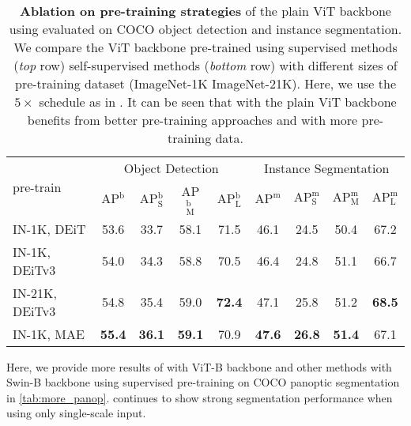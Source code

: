 \begin{table*}[t!]
    \centering
    \footnotesize
    {
    \begin{tabular}{l|cccc|cccc}
    \multirow{2}{*}{pre-train} & \multicolumn{4}{c|}{Object Detection} & \multicolumn{4}{c}{Instance Segmentation} \\
    & AP$^\text{b}$ & AP$^\text{b}_\text{S}$ & AP$^\text{b}_\text{M}$ & AP$^\text{b}_\text{L}$ & $\text{AP}^\text{m}$ & $\text{AP}^\text{m}_\text{S}$ & $\text{AP}^\text{m}_\text{M}$ & $\text{AP}^\text{m}_\text{L}$ \\
    \shline
    IN-1K, DEiT & 53.6 & 33.7 & 58.1 & 71.5 & 46.1 & 24.5 & 50.4 & 67.2 \\
    IN-1K, DEiTv3 & 54.0 & 34.3 & 58.8 & 70.5 & 46.4 & 24.8 & 51.1 & 66.7 \\
    IN-21K, DEiTv3 & 54.8 & 35.4 & 59.0 & {\bf 72.4} & 47.1 & 25.8 & 51.2 & {\bf 68.5} \\
    \hline
    IN-1K, MAE & {\bf 55.4} & {\bf 36.1} & {\bf 59.1} & 70.9 & {\bf 47.6} & {\bf 26.8} & {\bf 51.4} & 67.1 \\
    \end{tabular}
    }
    \caption{
        \textbf{Ablation on pre-training strategies} of the plain ViT backbone using \ours evaluated on COCO object detection and instance segmentation. We compare the ViT backbone pre-trained using supervised methods (\emph{top} row) \vs self-supervised methods (\emph{bottom} row) with different sizes of pre-training dataset (ImageNet-1K \vs ImageNet-21K). Here, we use the $5\times$ schedule as in \cite{nguyen2022boxer}. It can be seen that \ours with the plain ViT backbone benefits from better pre-training approaches and with more pre-training data.
    }\label{tab:pretrain}
\end{table*}
  
   Here, we provide more results of \ours with ViT-B backbone and other methods with Swin-B backbone using supervised pre-training on COCO panoptic segmentation in \cref{tab:more_panop}. \ours continues to show strong segmentation performance when using only single-scale input.
  
